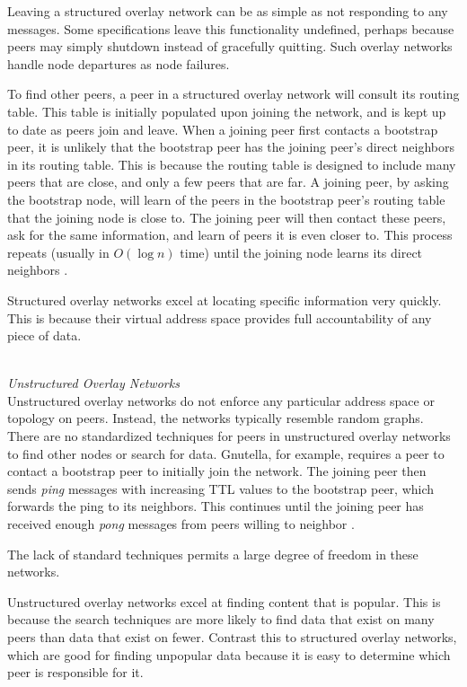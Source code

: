 \documentclass[12pt]{report}
\begin{document}
Leaving a structured overlay network can be as simple as not responding to any messages. Some specifications leave this functionality undefined, perhaps because peers may simply shutdown instead of gracefully quitting. Such overlay networks handle node departures as node failures.

To find other peers, a peer in a structured overlay network will consult its routing table. This table is initially populated upon joining the network, and is kept up to date as peers join and leave. When a joining peer first contacts a bootstrap peer, it is unlikely that the bootstrap peer has the joining peer's direct neighbors in its routing table. This is because the routing table is designed to include many peers that are close, and only a few peers that are far. A joining peer, by asking the bootstrap node, will learn of the peers in the bootstrap peer's routing table that the joining node is close to. The joining peer will then contact these peers, ask for the same information, and learn of peers it is even closer to. This process repeats (usually in $O(\log n)$ time) until the joining node learns its direct neighbors \cite{p2pSurvey}.

Structured overlay networks excel at locating specific information very quickly. This is because their virtual address space provides full accountability of any piece of data. %

\hfill \\
\textit{Unstructured Overlay Networks}
\hfill \\

Unstructured overlay networks do not enforce any particular address space or topology on peers. Instead, the networks typically resemble random graphs. There are no standardized techniques for peers in unstructured overlay networks to find other nodes or search for data. Gnutella, for example, requires a peer to contact a bootstrap peer to initially join the network. The joining peer then sends \textit{ping} messages with increasing TTL values to the bootstrap peer, which forwards the ping to its neighbors. This continues until the joining peer has received enough \textit{pong} messages from peers willing to neighbor \cite{p2pSurvey}. %

The lack of standard techniques permits a large degree of freedom in these networks. %

Unstructured overlay networks excel at finding content that is popular. This is because the search techniques are more likely to find data that exist on many peers than data that exist on fewer. Contrast this to structured overlay networks, which are good for finding unpopular data because it is easy to determine which peer is responsible for it. %
\end{document}
